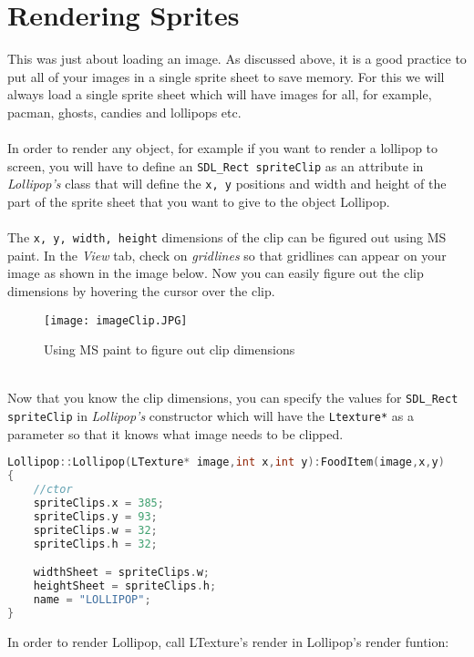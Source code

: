 \documentclass[11pt,fleqn]{book} %
\begin{document}
    \section{Rendering Sprites}
    
This was just about loading an image. As discussed above, it is a good practice to put all of your images in a single sprite sheet to save memory. For this we will always load a single sprite sheet which will have images for all, for example, pacman, ghosts, candies and lollipops etc.\\ \\
In order to render any object, for example if you want to render a lollipop to screen, you will have to define an \texttt{SDL\_Rect spriteClip} as an attribute in \textit{Lollipop's} class that will define the \texttt{x, y} positions and  width and height of the part of the sprite sheet that you want to give to the object Lollipop. \\ \\
The \texttt{x, y, width, height} dimensions of the clip can be figured out using MS paint.
In the \textit{View} tab, check on \textit{gridlines} so that gridlines can appear on your image as shown in the image below. Now you can easily figure out the clip dimensions by hovering the cursor over the clip.
\begin{figure}[ht]
            \centering
            \texttt{[image: imageClip.JPG]}
            \caption{Using MS paint to figure out clip dimensions}
            \label{fig:my_label}
\end{figure} \\ 
Now that you know the clip dimensions, you can specify the values for \texttt{SDL\_Rect spriteClip} in \textit{Lollipop's} constructor which will have the \texttt{Ltexture*} as a parameter so that it knows what image needs to be clipped. \\
\newpage
\begin{lstlisting}[language=C++, caption=Setting Sprite's dimensions; ]
Lollipop::Lollipop(LTexture* image,int x,int y):FoodItem(image,x,y)
{
    //ctor
    spriteClips.x = 385;
    spriteClips.y = 93;
    spriteClips.w = 32;
    spriteClips.h = 32;

    widthSheet = spriteClips.w;
    heightSheet = spriteClips.h;
    name = "LOLLIPOP";
}
\end{lstlisting} 

\noindent In order to render Lollipop, call LTexture's render in Lollipop's render funtion:
\end{document}
